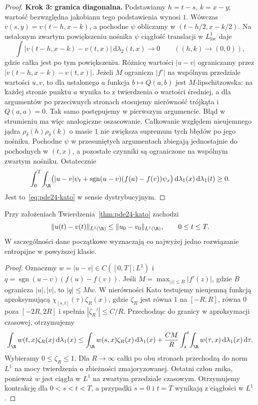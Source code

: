 \begin{proof}
\textbf{Krok 3: granica diagonalna.}
Podstawiamy $h=t-s$, $k=x-y$; wartość bezwzględna
jakobianu tego podstawienia wynosi $1$. Wówczas
$v(s,y)=v(t-h,x-k)$, a pochodne $\psi$ obliczamy
w $(t-h/2,x-k/2)$. Na ustalonym zwartym powiększeniu
nośnika $\psi$ ciągłość translacji w $L^1_{\mathrm{loc}}$
daje
\[
 \int |v(t-h,x-k)-v(t,x)|\,\mathrm d\lambda_2(t,x)
 \longrightarrow0
 \qquad ((h,k)\to(0,0)),
\]
gdzie całka jest po tym powiększeniu. Różnicę wartości
$|u-v|$ ograniczamy przez $|v(t-h,x-k)-v(t,x)|$.
Jeżeli $M$ ogranicza $|f'|$ na wspólnym przedziale wartości
$u,v$, to dla ustalonego $a$ funkcja $b\mapsto Q(a,b)$
jest $M$-lipschitzowska: na każdej stronie punktu $a$
wynika to z twierdzenia o wartości średniej, a dla
argumentów po przeciwnych stronach stosujemy nierówność
trójkąta i $Q(a,a)=0$. Tak samo postępujemy w pierwszym
argumencie. Błąd w strumieniu ma więc analogiczne
oszacowanie. Całkowanie względem nieujemnego jądra
$\rho_\delta(h)\rho_\delta(k)$ o masie $1$ nie zwiększa
supremum tych błędów po jego nośniku. Pochodne $\psi$
w przesuniętych argumentach zbiegają jednostajnie
do pochodnych w $(t,x)$, a pozostałe czynniki są
ograniczone na wspólnym zwartym nośniku. Ostatecznie
\[
 \int_0^T\!\int_\R
 \bigl(|u-v|\psi_t+
 \operatorname{sgn}(u-v)(f(u)-f(v))\psi_x\bigr)
 \,\mathrm d\lambda_1(x)\,\mathrm d\lambda_1(t)\ge0.
\]
Jest to~\eqref{eq:pde24-kato} w sensie dystrybucyjnym.
\end{proof}

\begin{twierdzenie}
\label{thm:pde24-L1}
Przy założeniach Twierdzenia~\ref{thm:pde24-kato} zachodzi
\begin{equation}\label{eq:pde24-L1}
 \|u(t)-v(t)\|_{L^1(\R)}
 \le\|u_0-v_0\|_{L^1(\R)},\qquad 0\le t\le T.
\end{equation}
W szczególności dane początkowe wyznaczają co najwyżej
jedno rozwiązanie entropijne w powyższej klasie.
\end{twierdzenie}
\begin{proof}
Oznaczmy $w=|u-v|\in C([0,T];L^1)$ i
$q=\operatorname{sgn}(u-v)(f(u)-f(v))$. Jeśli
$M=\max_{|z|\le B}|f'(z)|$, gdzie $B$ ogranicza
$|u|,|v|$, to $|q|\le Mw$. W nierówności Kato
testujemy nieujemną funkcją aproksymującą
$\chi_{[s,t]}(\tau)\zeta_R(x)$, gdzie $\zeta_R$ jest
równa $1$ na $[-R,R]$, równa $0$ poza $[-2R,2R]$
i spełnia $|\zeta_R'|\le C/R$. Przechodząc do granicy
w aproksymacji czasowej, otrzymujemy
\[
 \int_\R w(t,x)\zeta_R(x)\,\mathrm d\lambda_1(x)
 \le \int_\R w(s,x)\zeta_R(x)\,\mathrm d\lambda_1(x)
 +\frac{CM}{R}\int_s^t\!\int_\R w(\tau,x)
 \,\mathrm d\lambda_1(x)\,\mathrm d\tau.
\]
Wybieramy $0\le\zeta_R\le1$. Dla $R\to\infty$
całki po obu stronach przechodzą do norm $L^1$
na mocy twierdzenia o zbieżności zmajoryzowanej.
Ostatni człon znika, ponieważ $w$ jest ciągła
w $L^1$ na zwartym przedziale czasowym.
Otrzymujemy kontrakcję dla $0<s<t<T$,
a przypadki $s=0$ i $t=T$ wynikają z ciągłości
w $L^1$.
\end{proof}

